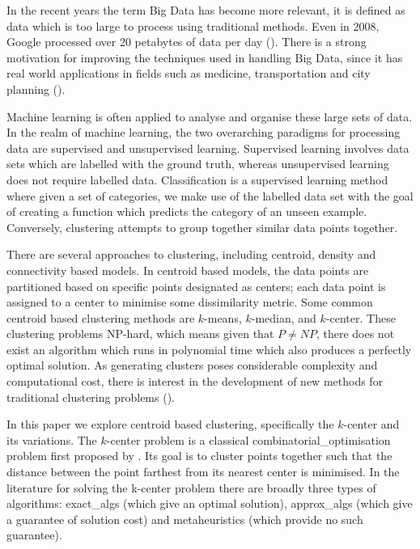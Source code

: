 In the recent years the term Big Data has become more relevant, it is defined as data which is too large to process using traditional methods. Even in 2008, Google processed over 20 petabytes of data per day (\cite{dean_mapreduce_2008}). There is a strong motivation for improving the techniques used in handling Big Data, since it has real world applications in fields such as medicine, transportation and city planning (\cite{al_nuaimi_applications_2015,obermeyer_predicting_2016}). 

Machine learning is often applied to analyse and organise these large sets of data. In the realm of machine learning, the two overarching paradigms for processing data are supervised and unsupervised learning. Supervised learning involves data sets which are labelled with the ground truth, whereas unsupervised learning does not require labelled data. Classification is a supervised learning method where given a set of categories, we make use of the labelled data set with the goal of creating a function which predicts the category of an unseen example. Conversely, clustering attempts to group together similar data points together. 

There are several approaches to clustering, including centroid, density and connectivity based models. In centroid based models, the data points are partitioned based on specific points designated as centers; each data point is assigned to a center to minimise some dissimilarity metric. Some common centroid based clustering methods are $k$-means, $k$-median, and $k$-center. These clustering problems NP-hard, which means given that $P\neq NP$, there does not exist an algorithm which runs in polynomial time which also produces a perfectly optimal solution. As generating clusters poses considerable complexity and computational cost, there is interest in the development of new methods for traditional clustering problems (\cite{zhao_parallel_1970}). 

In this paper we explore centroid based clustering, specifically the $k$-center and its variations. The $k$-center problem is a classical \gls{combinatorial_optimisation} problem first proposed by \textcite{hakimi_optimum_1964}. Its goal is to cluster points together such that the distance between the point farthest from its nearest center is minimised. In the literature for solving the k-center problem there are broadly three types of algorithms: \gls{exact_algs} (which give an optimal solution), \gls{approx_algs} (which give a guarantee of solution cost) and \glspl{metaheuristic} (which provide no such guarantee).

